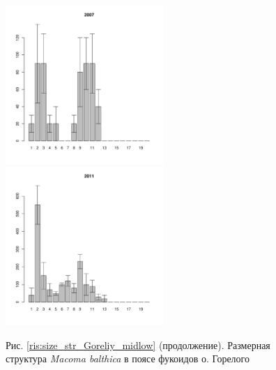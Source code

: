 \begin{figure}[h]

\begin{multicols}{3}
\hfill
\includegraphics[width=60mm]{../White_Sea/Luvenga_Goreliy/midlow_2007_.pdf}
\hfill
\includegraphics[width=60mm]{../White_Sea/Luvenga_Goreliy/midlow_2011_.pdf}
\end{multicols}


\begin{center}
Рис. \ref{ris:size_str_Goreliy_midlow} (продолжение). Размерная структура {\it Macoma balthica} в поясе фукоидов о. Горелого

\end{center}
\end{figure}


